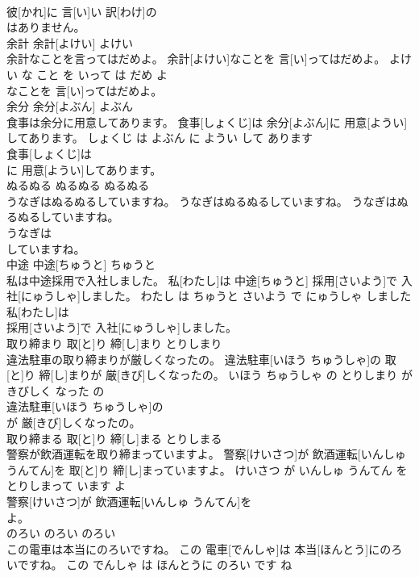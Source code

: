 \documentclass[8pt]{extreport}
\begin{document}
\begin{CJK}{UTF8}{min}
\\	彼[かれ]に 言[い]い 訳[わけ]の
\\	はありません。			
\\	余計	余計[よけい]	よけい	
\\	余計なことを言ってはだめよ。	余計[よけい]なことを 言[い]ってはだめよ。	よけい な こと を いって は だめ よ	
\\	なことを 言[い]ってはだめよ。			
\\	余分	余分[よぶん]	よぶん	
\\	食事は余分に用意してあります。	食事[しょくじ]は 余分[よぶん]に 用意[ようい]してあります。	しょくじ は よぶん に ようい して あります	
\\	食事[しょくじ]は
\\	に 用意[ようい]してあります。			
\\	ぬるぬる	ぬるぬる	ぬるぬる	
\\	うなぎはぬるぬるしていますね。	うなぎはぬるぬるしていますね。	うなぎはぬるぬるしていますね。	
\\	うなぎは
\\	していますね。			
\\	中途	中途[ちゅうと]	ちゅうと	
\\	私は中途採用で入社しました。	私[わたし]は 中途[ちゅうと] 採用[さいよう]で 入社[にゅうしゃ]しました。	わたし は ちゅうと さいよう で にゅうしゃ しました	
\\	私[わたし]は
\\	採用[さいよう]で 入社[にゅうしゃ]しました。			
\\	取り締まり	取[と]り 締[し]まり	とりしまり	
\\	違法駐車の取り締まりが厳しくなったの。	違法駐車[いほう ちゅうしゃ]の 取[と]り 締[し]まりが 厳[きび]しくなったの。	いほう ちゅうしゃ の とりしまり が きびしく なった の	
\\	違法駐車[いほう ちゅうしゃ]の
\\	が 厳[きび]しくなったの。			
\\	取り締まる	取[と]り 締[し]まる	とりしまる	
\\	警察が飲酒運転を取り締まっていますよ。	警察[けいさつ]が 飲酒運転[いんしゅ うんてん]を 取[と]り 締[し]まっていますよ。	けいさつ が いんしゅ うんてん を とりしまって います よ	
\\	警察[けいさつ]が 飲酒運転[いんしゅ うんてん]を
\\	よ。			
\\	のろい	のろい	のろい	
\\	この電車は本当にのろいですね。	この 電車[でんしゃ]は 本当[ほんとう]にのろいですね。	この でんしゃ は ほんとうに のろい です ね	

\end{CJK}
\end{document}
